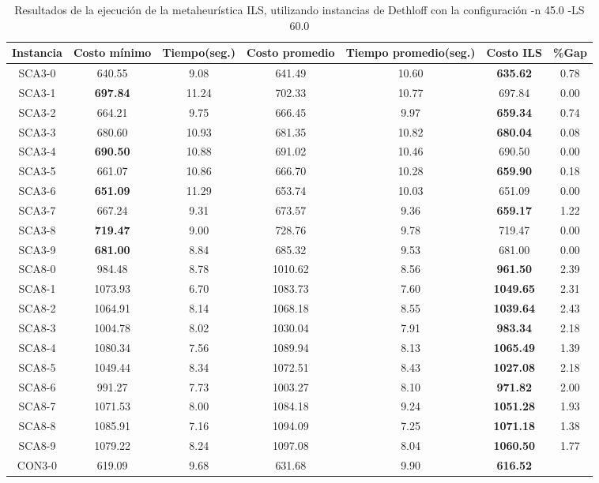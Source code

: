 \begin{table}[ht]
\caption{Resultados de la ejecución de la metaheurística ILS, utilizando instancias de Dethloff con la configuración -n 45.0 -LS 60.0}
\centering
\small
\begin{tabular}{c c c c c c c}
\hline\hline
Instancia & Costo mínimo & Tiempo(seg.) & Costo promedio & Tiempo promedio(seg.) & Costo ILS & \%Gap \\ [0.5ex]
\hline
SCA3-0 & 640.55 & 9.08 & 
641.49 & 10.60 & \bf{635.62} & 
0.78\\SCA3-1 & \bf{697.84} & 11.24 & 
702.33 & 10.77 & 697.84 & 0.00\\
SCA3-2 & 664.21 & 9.75 & 
666.45 & 9.97 & \bf{659.34} & 
0.74\\SCA3-3 & 680.60 & 10.93 & 
681.35 & 10.82 & \bf{680.04} & 
0.08\\SCA3-4 & \bf{690.50} & 10.88 & 
691.02 & 10.46 & 690.50 & 0.00\\
SCA3-5 & 661.07 & 10.86 & 
666.70 & 10.28 & \bf{659.90} & 
0.18\\SCA3-6 & \bf{651.09} & 11.29 & 
653.74 & 10.03 & 651.09 & 0.00\\
SCA3-7 & 667.24 & 9.31 & 
673.57 & 9.36 & \bf{659.17} & 
1.22\\SCA3-8 & \bf{719.47} & 9.00 & 
728.76 & 9.78 & 719.47 & 0.00\\
SCA3-9 & \bf{681.00} & 8.84 & 
685.32 & 9.53 & 681.00 & 0.00\\
SCA8-0 & 984.48 & 8.78 & 
1010.62 & 8.56 & \bf{961.50} & 
2.39\\SCA8-1 & 1073.93 & 6.70 & 
1083.73 & 7.60 & \bf{1049.65} & 
2.31\\SCA8-2 & 1064.91 & 8.14 & 
1068.18 & 8.55 & \bf{1039.64} & 
2.43\\SCA8-3 & 1004.78 & 8.02 & 
1030.04 & 7.91 & \bf{983.34} & 
2.18\\SCA8-4 & 1080.34 & 7.56 & 
1089.94 & 8.13 & \bf{1065.49} & 
1.39\\SCA8-5 & 1049.44 & 8.34 & 
1072.51 & 8.43 & \bf{1027.08} & 
2.18\\SCA8-6 & 991.27 & 7.73 & 
1003.27 & 8.10 & \bf{971.82} & 
2.00\\SCA8-7 & 1071.53 & 8.00 & 
1084.18 & 9.24 & \bf{1051.28} & 
1.93\\SCA8-8 & 1085.91 & 7.16 & 
1094.09 & 7.25 & \bf{1071.18} & 
1.38\\SCA8-9 & 1079.22 & 8.24 & 
1097.08 & 8.04 & \bf{1060.50} & 
1.77\\CON3-0 & 619.09 & 9.68 & 
631.68 & 9.90 & \bf{616.52} & 

\end{tabular}
\end{table}
